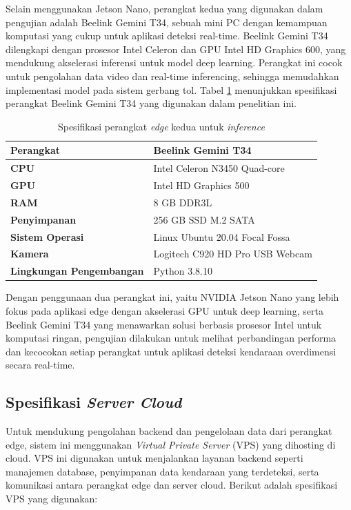 Selain menggunakan Jetson Nano, perangkat kedua yang digunakan dalam pengujian adalah Beelink Gemini T34, sebuah mini PC dengan kemampuan komputasi yang cukup untuk aplikasi deteksi real-time. Beelink Gemini T34 dilengkapi dengan prosesor Intel Celeron dan GPU Intel HD Graphics 600, yang mendukung akselerasi inferensi untuk model deep learning. Perangkat ini cocok untuk pengolahan data video dan real-time inferencing, sehingga memudahkan implementasi model pada sistem gerbang tol. Tabel \ref{tab:beelink_t34_specs} menunjukkan spesifikasi perangkat Beelink Gemini T34 yang digunakan dalam penelitian ini.

\begin{table}[htbp]
  \centering
  \begin{tabular}{|l|l|}
  \hline
  \textbf{Perangkat} & Beelink Gemini T34 \\
  \hline
  \textbf{CPU} & Intel Celeron N3450 Quad-core \\
  \hline
  \textbf{GPU} & Intel HD Graphics 500 \\
  \hline
  \textbf{RAM} & 8 GB DDR3L \\
  \hline
  \textbf{Penyimpanan} & 256 GB SSD M.2 SATA \\
  \hline
  \textbf{Sistem Operasi} & Linux Ubuntu 20.04 Focal Fossa \\
  \hline
  \textbf{Kamera} & Logitech C920 HD Pro USB Webcam \\
  \hline
  \textbf{Lingkungan Pengembangan} & Python 3.8.10 \\
  \hline
  \end{tabular}
  \caption{Spesifikasi perangkat \emph{edge} kedua untuk \emph{inference}}
  \label{tab:beelink_t34_specs}
\end{table}

Dengan penggunaan dua perangkat ini, yaitu NVIDIA Jetson Nano yang lebih fokus pada aplikasi edge dengan akselerasi GPU untuk deep learning, serta Beelink Gemini T34 yang menawarkan solusi berbasis prosesor Intel untuk komputasi ringan, pengujian dilakukan untuk melihat perbandingan performa dan kecocokan setiap perangkat untuk aplikasi deteksi kendaraan overdimensi secara real-time.

\subsection{Spesifikasi \emph{Server Cloud}}

Untuk mendukung pengolahan backend dan pengelolaan data dari perangkat edge, sistem ini menggunakan \emph{Virtual Private Server} (VPS) yang dihosting di cloud. VPS ini digunakan untuk menjalankan layanan backend seperti manajemen database, penyimpanan data kendaraan yang terdeteksi, serta komunikasi antara perangkat edge dan server cloud. Berikut adalah spesifikasi VPS yang digunakan:

